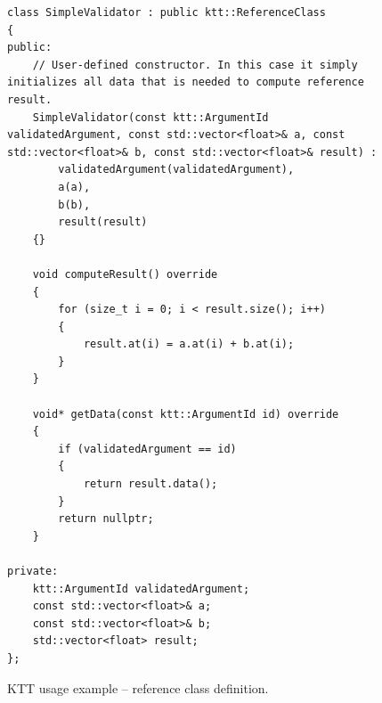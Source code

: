\documentclass
[
    digital, %
    oneside, %
    table, %
    nolof, %
    nolot, %
    nocover %
]{fithesis3}
\begin{document}
\begin{figure}
\footnotesize
\begin{adjustwidth}{-1cm}{-1cm}
\begin{lstlisting}
class SimpleValidator : public ktt::ReferenceClass
{
public:
    // User-defined constructor. In this case it simply initializes all data that is needed to compute reference result.
    SimpleValidator(const ktt::ArgumentId validatedArgument, const std::vector<float>& a, const std::vector<float>& b, const std::vector<float>& result) :
        validatedArgument(validatedArgument),
        a(a),
        b(b),
        result(result)
    {}
    
    void computeResult() override
    {
        for (size_t i = 0; i < result.size(); i++)
        {
            result.at(i) = a.at(i) + b.at(i);
        }
    }
    
    void* getData(const ktt::ArgumentId id) override
    {
        if (validatedArgument == id)
        {
            return result.data();
        }
        return nullptr;
    }
    
private:
    ktt::ArgumentId validatedArgument;
    const std::vector<float>& a;
    const std::vector<float>& b;
    std::vector<float> result;
};
\end{lstlisting}
\caption{KTT usage example -- reference class definition.}
\label{ktt-api-usage-reference}
\end{adjustwidth}
\end{figure}
\end{document}
